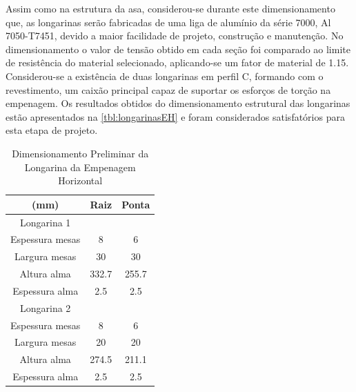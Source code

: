 Assim como na estrutura da asa, considerou-se durante este dimensionamento que, as longarinas serão fabricadas de uma liga de alumínio da série 7000, Al 7050-T7451, devido a maior facilidade de projeto, construção e manutenção. No dimensionamento o valor de tensão obtido em cada seção foi comparado ao limite de resistência do material selecionado, aplicando-se um fator de material de 1.15.
Considerou-se a existência de duas longarinas em perfil C, formando com o revestimento, um caixão principal capaz de suportar os esforços de torção na empenagem.
Os resultados obtidos do dimensionamento estrutural das longarinas estão apresentados na \autoref{tbl:longarinasEH} e foram considerados satisfatórios para esta etapa de projeto.

\begin{table}[H]
\centering
\begin{tabular}{ccc}
\toprule
(mm) & Raiz & Ponta \\ \midrule
Longarina 1 &  &   \\ \midrule
Espessura mesas & 8 & 6 \\
Largura mesas & 30 & 30\\
Altura alma & 332.7 & 255.7 \\
Espessura alma & 2.5 & 2.5 \\ \midrule
Longarina 2 &  &   \\ \midrule
Espessura mesas & 8 & 6 \\
Largura mesas & 20 & 20 \\
Altura alma & 274.5 & 211.1 \\
Espessura alma & 2.5 & 2.5 \\
\bottomrule
\end{tabular}
\caption{Dimensionamento Preliminar da Longarina da Empenagem Horizontal}
\label{tbl:longarinasEH}
\end{table}
